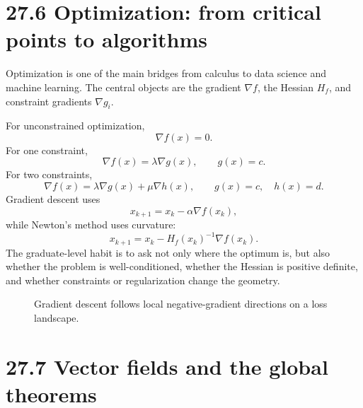 \documentclass[11pt]{article}
\newcommand{\grad}{\nabla}
\begin{document}
\section*{27.6 Optimization: from critical points to algorithms}

Optimization is one of the main bridges from calculus to data science and machine learning. The central objects are the gradient $\grad f$, the Hessian $H_f$, and constraint gradients $\grad g_i$.

For unconstrained optimization,
\[
\grad f(x)=0.
\]
For one constraint,
\[
\grad f(x)=\lambda \grad g(x),\qquad g(x)=c.
\]
For two constraints,
\[
\grad f(x)=\lambda \grad g(x)+\mu \grad h(x),\qquad g(x)=c,\quad h(x)=d.
\]
Gradient descent uses
\[
x_{k+1}=x_k-\alpha\grad f(x_k),
\]
while Newton's method uses curvature:
\[
x_{k+1}=x_k-H_f(x_k)^{-1}\grad f(x_k).
\]
The graduate-level habit is to ask not only where the optimum is, but also whether the problem is well-conditioned, whether the Hessian is positive definite, and whether constraints or regularization change the geometry.

\begin{figure}[H]
\centering
{}
\caption{Gradient descent follows local negative-gradient directions on a loss landscape.}
\end{figure}

\section*{27.7 Vector fields and the global theorems}
\end{document}
